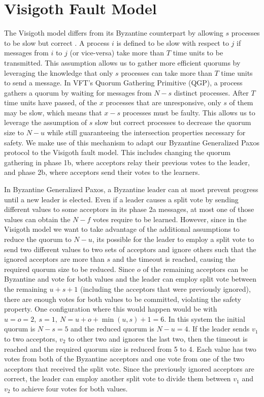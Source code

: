 \section{Visigoth Fault Model} \label{Visigoth Fault Model}

The Visigoth model differs from its Byzantine counterpart by allowing $s$ processes to be slow but correct \cite{Porto2015}. A process $i$ is defined to be slow with respect to $j$ if messages from $i$ to $j$ (or vice-versa) take more than $T$ time units to be transmitted. This assumption allows us to gather more efficient quorums by leveraging the knowledge that only $s$ processes can take more than $T$ time units to send a message. In VFT's Quorum Gathering Primitive (QGP), a process gathers a quorum by waiting for messages from $N-s$ distinct processes. After $T$ time units have passed, of the $x$ processes that are unresponsive, only $s$ of them may be slow, which means that $x-s$ processes must be faulty. This allows us to leverage the assumption of $s$ slow but correct processes to decrease the quorum size to $N-u$ while still guaranteeing the intersection properties necessary for safety. We make use of this mechanism to adapt our Byzantine Generalized Paxos protocol to the Visigoth fault model. This includes changing the quorum gathering in phase 1b, where acceptors relay their previous votes to the leader, and phase 2b, where acceptors send their votes to the learners. \par
In Byzantine Generalized Paxos, a Byzantine leader can at most prevent progress until a new leader is elected. Even if a leader causes a split vote by sending different values to some acceptors in its phase 2a messages, at most one of those values can obtain the $N-f$ votes require to be learned. However, since in the Visigoth model we want to take advantage of the additional assumptions to reduce the quorum to $N-u$, its possible for the leader to employ a split vote to send two different values to two sets of acceptors and ignore others such that the ignored acceptors are more than $s$ and the timeout is reached, causing the required quorum size to be reduced. Since $o$ of the remaining acceptors can be Byzantine and vote for both values and the leader can employ split vote between the remaining $u+s+1$ (including the acceptors that were previously ignored), there are enough votes for both values to be committed, violating the safety property. One configuration where this would happen would be with $u=o=2,\ s=1,\ N=u+o+\min(u,s)+1=6$. In this system the initial quorum is $N-s=5$ and the reduced quorum is $N-u=4$. If the leader sends $v_1$ to two acceptors, $v_2$ to other two and ignores the last two, then the timeout is reached and the required quorum size is reduced from 5 to 4. Each value has two votes from both of the Byzantine acceptors and one vote from one of the two acceptors that received the split vote. Since the previously ignored acceptors are correct, the leader can employ another split vote to divide them between $v_1$ and $v_2$ to achieve four votes for both values. \par
